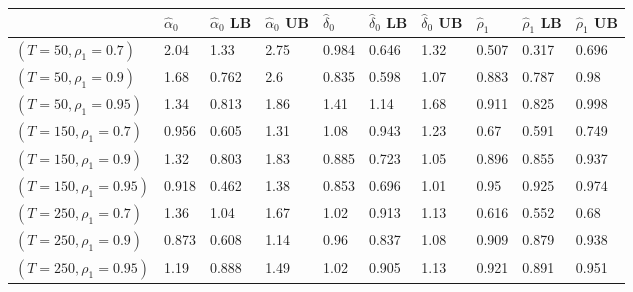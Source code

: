 \begin{tabular}{llllllllll}
& $\hat{\alpha}_0$ & $\hat{\alpha}_0$ LB & $\hat{\alpha}_0$ UB & $\hat{\delta}_0$ & $\hat{\delta}_0$ LB & $\hat{\delta}_0$ UB & $\hat{\rho}_1$ & $\hat{\rho}_1$ LB & $\hat{\rho}_1$ UB \\ 
\hline 
$(T=50,\rho_1=0.7)$ & 2.04 & 1.33 & 2.75 & 0.984 & 0.646 & 1.32 & 0.507 & 0.317 & 0.696 \\ 
$(T=50,\rho_1=0.9)$ & 1.68 & 0.762 & 2.6 & 0.835 & 0.598 & 1.07 & 0.883 & 0.787 & 0.98 \\ 
$(T=50,\rho_1=0.95)$ & 1.34 & 0.813 & 1.86 & 1.41 & 1.14 & 1.68 & 0.911 & 0.825 & 0.998 \\ 
$(T=150,\rho_1=0.7)$ & 0.956 & 0.605 & 1.31 & 1.08 & 0.943 & 1.23 & 0.67 & 0.591 & 0.749 \\ 
$(T=150,\rho_1=0.9)$ & 1.32 & 0.803 & 1.83 & 0.885 & 0.723 & 1.05 & 0.896 & 0.855 & 0.937 \\ 
$(T=150,\rho_1=0.95)$ & 0.918 & 0.462 & 1.38 & 0.853 & 0.696 & 1.01 & 0.95 & 0.925 & 0.974 \\ 
$(T=250,\rho_1=0.7)$ & 1.36 & 1.04 & 1.67 & 1.02 & 0.913 & 1.13 & 0.616 & 0.552 & 0.68 \\ 
$(T=250,\rho_1=0.9)$ & 0.873 & 0.608 & 1.14 & 0.96 & 0.837 & 1.08 & 0.909 & 0.879 & 0.938 \\ 
$(T=250,\rho_1=0.95)$ & 1.19 & 0.888 & 1.49 & 1.02 & 0.905 & 1.13 & 0.921 & 0.891 & 0.951 \\ 
\hline 
\end{tabular}